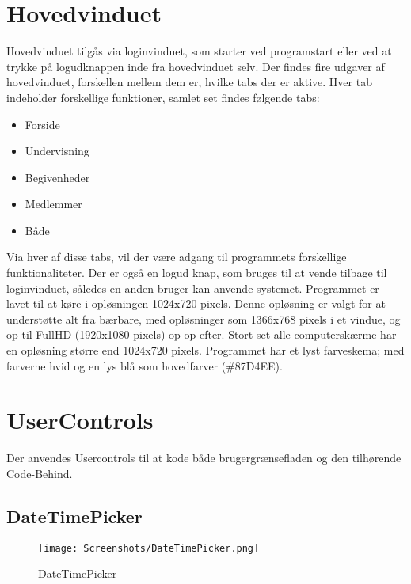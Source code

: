 \section{Hovedvinduet}
Hovedvinduet tilgås via loginvinduet, som starter ved programstart eller ved at trykke på logudknappen inde fra hovedvinduet selv. 
Der findes fire udgaver af hovedvinduet, forskellen mellem dem er, hvilke tabs der er aktive.
Hver tab indeholder forskellige funktioner, samlet set findes følgende tabs:
\begin{itemize}%
    \item Forside
    \item Undervisning
    \item Begivenheder
    \item Medlemmer
    \item Både
\end{itemize}

Via hver af disse tabs, vil der være adgang til programmets forskellige funktionaliteter.
Der er også en logud knap, som bruges til at vende tilbage til loginvinduet, således en anden bruger kan anvende systemet.
Programmet er lavet til at køre i opløsningen 1024x720 pixels.
Denne opløsning er valgt for at understøtte alt fra bærbare, med opløsninger som 1366x768 pixels i et vindue, og op til FullHD (1920x1080 pixels) op op efter. 
Stort set alle computerskærme har en opløsning større end 1024x720 pixels\citep{resolutions}. 
Programmet har et lyst farveskema; med farverne hvid og en lys blå som hovedfarver (\#87D4EE).

\section{UserControls}
Der anvendes Usercontrols til at kode både brugergrænsefladen og den tilhørende Code-Behind.

\subsection{DateTimePicker}\label{subsec:DateTimePicker}

\begin{wrapfigure}{r}{0.5\textwidth}
    \label{img:DateTimePicker}
    \vspace{-20pt}
    \begin{center}
        \texttt{[image: Screenshots/DateTimePicker.png]}
    \end{center}
    \vspace{-15pt}
    \caption{DateTimePicker}
    \vspace{-30pt}
\end{wrapfigure}


